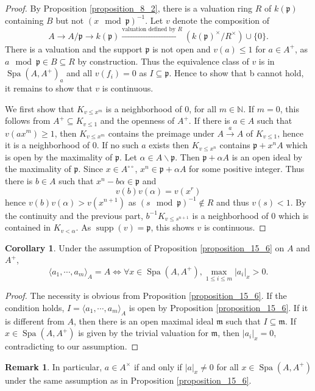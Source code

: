 \documentclass[10pt]{article}
\numberwithin{equation}{section}
\theoremstyle{definition}
\newtheorem{remark}{Remark}[subsection]
\newtheorem{corollary}{Corollary} [subsection]
\DeclareMathOperator{\supp}{supp}
\DeclareMathOperator{\Spa}{Spa}
\newcommand{\N}[0]{\mathbb{N}}
\newcommand{\m}[0]{\mathfrak{m}}
\newcommand{\p}[0]{\mathfrak{p}}
\newcommand{\dcirc}[0]{{\circ\circ}}
\begin{document}
\begin{proof}
By Proposition \ref{proposition_8_2}, there is a valuation ring $R$ of $k(\p)$ containing $B$ but not $(x\mod\p)^{-1}$. Let $v$ denote the composition of
\begin{equation*}
    A\to A/\p \to k(\p)\stackrel{\text{valuation defined by $R$}}{\to}(k(\p)^\times/R^\times)\cup\{0\}.
\end{equation*}
There is a valuation and the support $\p$ is not open and $v(a)\leq1$ for $a\in A^+$, as $a\mod\p\in B\subseteq R$ by construction.
Thus the equivalence class of $v$ is in $\Spa(A,A^+)_a$ and all $v(f_i)=0$ as $I\subseteq\p$. Hence to show that b cannot hold, it remains to show that $v$ is continuous.
\par We first show that $K_{v\leq x^m}$ is a neighborhood of $0$, for all $m\in\N$. If $m=0$, this follows from $A^+\subseteq K_{v\leq 1}$ and the openness of $A^+$. If there is $a\in A$ such that $v(ax^m)\geq1$, then $K_{v\leq x^m}$ contains the preimage under $A\stackrel{a}{\to}A$ of $K_{v\leq1}$, hence it is a neighborhood of $0$. If no such $a$ exists then $K_{v\leq x^n}$ contains $\p+x^n A$ which is open by the maximality of $\p$.
Let $\alpha\in A\backslash\p$. Then $\p+\alpha A$ is an open ideal by the maximality of $\p$. Since $x\in A^\dcirc$, $x^n\in\p+\alpha A$ for some positive integer. Thus there is $b\in A$ such that $x^n-b\alpha\in\p$ and
\begin{equation*}
    v(b)v(\alpha) = v(x^r)
\end{equation*}
hence $v(b)v(\alpha)>v(x^{n+1})$ as $(s\mod{\p})^{-1}\not\in R$ and thus $v(s)<1$.
By the continuity and the previous part, $b^{-1}K_{v\leq s^{n+1}}$ is a neighborhood of $0$ which is contained in $K_{v<\alpha}$. As $\supp(v)=\p$, this shows $v$ is continuous.
\end{proof}

\begin{corollary}
    \label{corollary_16_3}
    Under the assumption of Proposition \ref{proposition_15_6} on $A$ and $A^+$,
    \begin{equation*}
        \langle a_1,\cdots,a_m\rangle_A = A\iff \forall x\in \Spa(A,A^+), \max_{1\leq i\leq m}\vert a_i\vert_x >0.
     \end{equation*}
\end{corollary}
\begin{proof}
    The necessity is obvious from Proposition \ref{proposition_15_6}. If the condition holds, $I=\langle a_1,\cdots,a_m\rangle_A$ is open by Proposition \ref{proposition_15_6}. If it is different from $A$, then there is an open maximal ideal $\m$ such that $I\subseteq \m$. If $x\in\Spa(A,A^+)$ is given by the trivial valuation for $\m$, then $\vert a_i\vert_x=0$, contradicting to our assumption.
\end{proof}
\begin{remark}
    In particular, $a\in A^\times$ if and only if $\vert a\vert_x\not=0$ for all $x\in\Spa(A,A^+)$ under the same assumption as in Proposition \ref{proposition_15_6}.
\end{remark}
\end{document}
